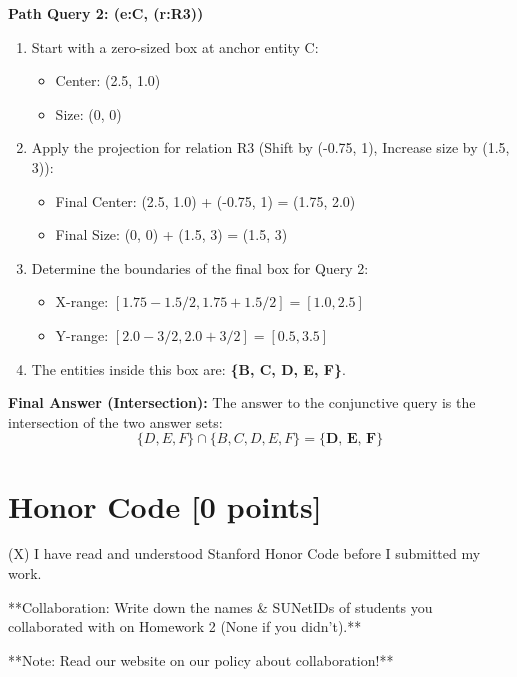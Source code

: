 \documentclass{article}
\numberwithin{figure}{section}
\begin{document}
{	\textbf{Path Query 2: (e:C, (r:R3))}
	\begin{enumerate}
		\item Start with a zero-sized box at anchor entity C:
		\begin{itemize}
			\item Center: (2.5, 1.0)
			\item Size: (0, 0)
		\end{itemize}
		\item Apply the projection for relation R3 (Shift by (-0.75, 1), Increase size by (1.5, 3)):
		\begin{itemize}
			\item Final Center: (2.5, 1.0) + (-0.75, 1) = (1.75, 2.0)
			\item Final Size: (0, 0) + (1.5, 3) = (1.5, 3)
		\end{itemize}
		\item Determine the boundaries of the final box for Query 2:
		\begin{itemize}
			\item X-range: $[1.75 - 1.5/2, 1.75 + 1.5/2] = [1.0, 2.5]$
			\item Y-range: $[2.0 - 3/2, 2.0 + 3/2] = [0.5, 3.5]$
		\end{itemize}
		\item The entities inside this box are: \textbf{\{B, C, D, E, F\}}.
	\end{enumerate}
	
	\textbf{Final Answer (Intersection):}
	The answer to the conjunctive query is the intersection of the two answer sets:
	\[ \{D, E, F\} \cap \{B, C, D, E, F\} = \textbf{\{D, E, F\}} \]
}


% 

\section{Honor Code [0 points]}
(X) I have read and understood Stanford Honor Code before I submitted my
work.

**Collaboration: Write down the names \& SUNetIDs of students you collaborated with on Homework 2 (None if you didn’t).**

**Note: Read our website on our policy about collaboration!**
\end{document}
